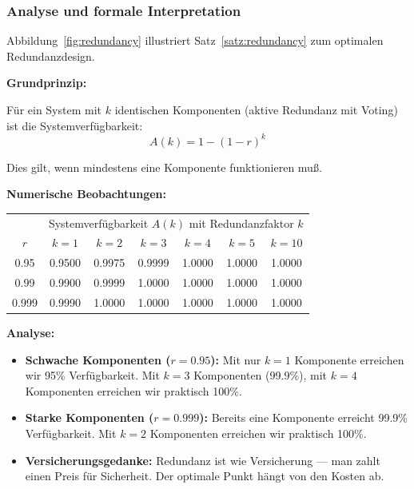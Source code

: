 \documentclass[a4paper,11pt]{article}
\theoremstyle{definition}
\begin{document}
\subsubsection{Analyse und formale Interpretation}

Abbildung~\ref{fig:redundancy} illustriert Satz~\ref{satz:redundancy} zum optimalen Redundanzdesign.

\textbf{Grundprinzip:}

Für ein System mit $k$ identischen Komponenten (aktive Redundanz mit Voting) ist die 
Systemverfügbarkeit:
\[
    A(k) = 1 - (1 - r)^k
\]

Dies gilt, wenn mindestens eine Komponente funktionieren muß.

\textbf{Numerische Beobachtungen:}

\begin{table}[H]
    \centering
    \begin{tabular}{|c|cccccc|}
        \hline
        & \multicolumn{6}{c|}{Systemverfügbarkeit $A(k)$ mit Redundanzfaktor $k$} \\
        $r$ & $k=1$ & $k=2$ & $k=3$ & $k=4$ & $k=5$ & $k=10$ \\
        \hline
        0.95 & 0.9500 & 0.9975 & 0.9999 & 1.0000 & 1.0000 & 1.0000 \\
        0.99 & 0.9900 & 0.9999 & 1.0000 & 1.0000 & 1.0000 & 1.0000 \\
        0.999 & 0.9990 & 1.0000 & 1.0000 & 1.0000 & 1.0000 & 1.0000 \\
        \hline
    \end{tabular}
\end{table}

\textbf{Analyse:}

\begin{itemize}
    \item \textbf{Schwache Komponenten ($r = 0.95$):}
          Mit nur $k = 1$ Komponente erreichen wir 95\% Verfügbarkeit. Mit $k = 3$ 
          Komponenten (99.9\%), mit $k = 4$ Komponenten erreichen wir praktisch 100\%.
    
    \item \textbf{Starke Komponenten ($r = 0.999$):}
          Bereits eine Komponente erreicht 99.9\% Verfügbarkeit. Mit $k = 2$ Komponenten 
          erreichen wir praktisch 100\%.
    
    \item \textbf{Versicherungsgedanke:} Redundanz ist wie Versicherung --- man zahlt einen Preis 
          für Sicherheit. Der optimale Punkt hängt von den Kosten ab.
\end{itemize}
\end{document}
